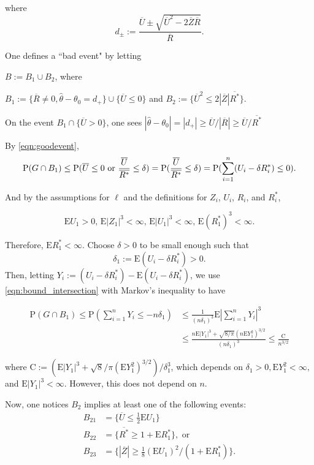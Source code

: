 where
$$
d_{\pm}:=\frac{\overline{U}\pm\sqrt{\overline{U}^{2}-2\overline{Z}\overline{R}}}{\overline{R}}.
$$

One defines a ``bad event" by letting

$B :=B_{1}\cup B_{2}$, where

$B_{1} :=\{\overline{R}\neq 0,\hat{\theta}-\theta_{0}=d_{+}\}\cup\{\overline{U}\leq 0\}$ and $B_{2} :=\{\overline{U}^{2}\leq 2|\overline{Z}|\overline{R^{*}}\}.$

On the event $B_1 \cap \{\overline{U}>0\}$, one sees $|\hat{\theta}-\theta_{0}|=|d_{+}|\geq \overline{U}/|\overline{R}|\geq\overline{U}/\overline{R^{*}}$

By \eqref{eqn:goodevent},
\begin{equation}\label{eqn:bound_intersection}
	\mathrm{P}(G\cap B_{1})\leq \mathrm{P}(\overline{U}\leq 0 \textrm{ or } \frac{\overline{U}}{\overline{R^{*}}}\leq \delta) =\mathrm{P}( \frac{\overline{U}}{\overline{R^{*}}}\leq \delta)=\mathrm{P}(\sum_{i=1}^{n}(U_{i}-\delta R_{i}^{*})\leq 0).
\end{equation}

And by the assumptions for $\ell$ and the definitions for $Z_i$, $U_i$, $R_i$, and $R^{*}_i$,

\[
\mathrm{E}U_{1}>0,\, \mathrm{E}|Z_{1}|^{3}<\infty,\, \mathrm{E}|U_{1}|^{3}<\infty,\, \mathrm{E}(R_{1}^{*})^{3}<\infty.
\]

Therefore, $\mathrm{E}R_{1}^{*}<\infty$. Choose $\delta>0$ to be small enough such that
$$
\delta_{1}:=\mathrm{E}(U_{i}-\delta R_{i}^{*})>0.
$$
Then, letting $Y_{i} :=(U_{i}-\delta R_{i}^{*})-\mathrm{E}(U_{i}-\delta R_{i}^{*})$, we use \eqref{eqn:bound_intersection} with Markov's inequality to have

\begin{align*}
	\mathrm{P}(G\cap B_{1})\leq \mathrm{P}(\sum_{i=1}^{n}Y_{i}\leq-n\delta_{1})&\leq\frac{1}{(n\delta_{1})^{3}}\mathrm{E}|\sum_{i=1}^{n}Y_{i}|^{3}
	\\
	&\leq\frac{n\mathrm{E}|Y_{1}|^{3}+\sqrt{8/\pi}(n\mathrm{E}Y_{1}^{2})^{3/2}}{(n\delta_{1})^{3}}\leq\frac{\mathrm{C}}{n^{3/2}}
\end{align*}

where $\mathrm{C}:=(\mathrm{E}|Y_{1}|^{3}+\sqrt{8}/\pi(\mathrm{E}Y_{1}^{2})^{3/2})/\delta_{1}^{3}$, which depends on $\delta_{1}>0, \mathrm{E}Y_{1}^{2}<\infty,$ and $\mathrm{E}|Y_{1}|^{3}<\infty$. However, this does not depend on $n$.

Now, one notices $B_{2}$ implies at least one of the following events:
\begin{align*}
	B_{21} &=\displaystyle\{\overline{U}\leq\frac{1}{2}\mathrm{E}U_{1}\} \\
	B_{22} &=\{\overline{R^{*}}\geq 1+\mathrm{E}R_{1}^{*}\}, \textrm{ or}\\ 
	B_{23} &= \displaystyle \{|\overline{Z}|\geq\frac{1}{8}(\mathrm{E}U_{1})^{2}/(1+\mathrm{E}R_{1}^{*})\}. 
\end{align*}

